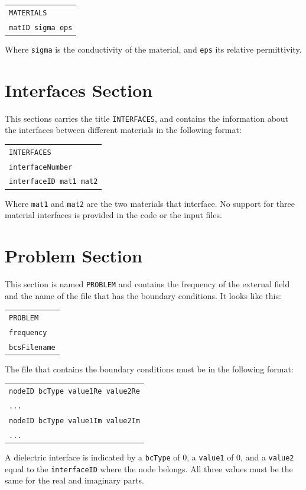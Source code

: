 \documentclass[12pt]{report}
\begin{document}
\begin{tabular}{l}
\texttt{MATERIALS}\\
\texttt{matID sigma eps}
\end{tabular}

Where \verb+sigma+ is the conductivity of the material, and \verb+eps+ its relative permittivity.

\section{Interfaces Section}
This sections carries the title \verb+INTERFACES+, and contains the information about the interfaces between different materials in the following format:

\begin{tabular}{l}
\texttt{INTERFACES}\\
\texttt{interfaceNumber}\\
\texttt{interfaceID mat1 mat2}\\
\end{tabular}

Where \verb+mat1+ and \verb+mat2+ are the two materials that interface. No support for three material interfaces is provided in the code or the input files.

\section{Problem Section}
This section is named \verb+PROBLEM+ and contains the frequency of the external field and the name of the file that has the boundary conditions. It looks like this:

\begin{tabular}{l}
\texttt{PROBLEM}\\
\texttt{frequency}\\
\texttt{bcsFilename}
\end{tabular}

The file that contains the boundary conditions must be in the following format:

\begin{tabular}{l}
\texttt{nodeID bcType value1Re value2Re}\\
\texttt{...}\\
\texttt{nodeID bcType value1Im value2Im}\\
\texttt{...}
\end{tabular}

A dielectric interface is indicated by a \verb+bcType+ of 0, a \verb+value1+ of 0, and a \verb+value2+ equal to the \verb+interfaceID+ where the node belongs. All three values must be the same for the real and imaginary parts.
\end{document}
